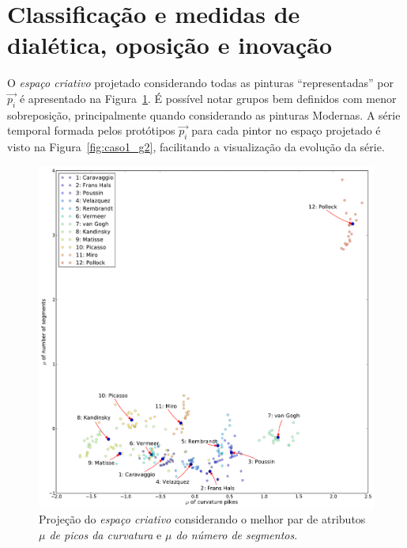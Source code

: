 \section{Classificação e medidas de dialética, oposição e inovação}
\label{sec:medidas}


O \textit{espaço criativo} projetado considerando todas as pinturas
``representadas'' por $\vec{p_i}$ é apresentado na Figura~\ref{fig:caso1_g1}. É
possível notar grupos bem definidos com menor sobreposição, principalmente
quando considerando as pinturas Modernas. A série temporal formada pelos
protótipos $\vec{p_i}$ para cada pintor no espaço projetado é visto na
Figura~\ref{fig:caso1_g2}, facilitando a visualização da evolução da série.

\begin{figure}[h!]
\begin{center}
        \includegraphics[scale=.5]{figs/caso1_g1}
      \caption{Projeção do \textit{espaço criativo} considerando o melhor par de
        atributos \emph{$\mu$ de picos da curvatura} e \emph{$\mu$ do número de segmentos}.}
        \label{fig:caso1_g1}
\end{center}
\end{figure}

